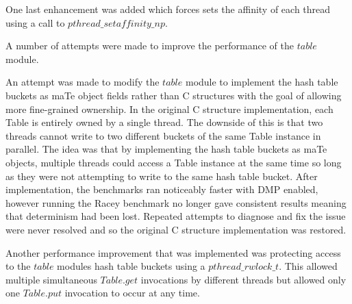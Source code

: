 One last enhancement was added which forces sets the affinity of each
thread using a call to $pthread\_setaffinity\_np$.

A number of attempts were made to improve the performance of the
$table$ module.

An attempt was made to modify the $table$ module to implement the hash
table buckets as maTe object fields rather than C structures with the
goal of allowing more fine-grained ownership.  In the original C
structure implementation, each Table is entirely owned by a single
thread.  The downside of this is that two threads cannot write to two
different buckets of the same Table instance in parallel.  The idea
was that by implementing the hash table buckets as maTe objects,
multiple threads could access a Table instance at the same time so
long as they were not attempting to write to the same hash table
bucket.  After implementation, the benchmarks ran noticeably faster
with DMP enabled, however running the Racey benchmark no longer gave
consistent results meaning that determinism had been lost.  Repeated
attempts to diagnose and fix the issue were never resolved and so the
original C structure implementation was restored.

Another performance improvement that was implemented was protecting
access to the $table$ modules hash table buckets using a
$pthread\_rwlock\_t$.  This allowed multiple simultaneous $Table.get$
invocations by different threads but allowed only one $Table.put$
invocation to occur at any time.


